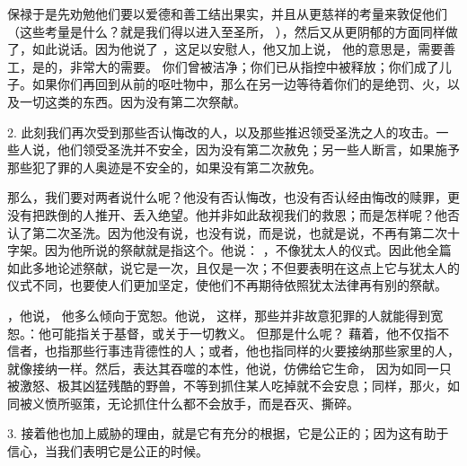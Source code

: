 保禄于是先劝勉他们要以爱德和善工结出果实，并且从更慈祥的考量来敦促他们（这些考量是什么？就是我们得以进入至圣所， ），然后又从更阴郁的方面同样做了，如此说话。因为他说了 ，这足以安慰人，他又加上说， 他的意思是，需要善工，是的，非常大的需要。 你们曾被洁净；你们已从指控中被释放；你们成了儿子。如果你们再回到从前的呕吐物中，那么在另一边等待着你们的是绝罚、火，以及一切这类的东西。因为没有第二次祭献。\par

2. 此刻我们再次受到那些否认悔改的人，以及那些推迟领受圣洗之人的攻击。一些人说，他们领受圣洗并不安全，因为没有第二次赦免；另一些人断言，如果施予那些犯了罪的人奥迹是不安全的，如果没有第二次赦免。\par

那么，我们要对两者说什么呢？他没有否认悔改，也没有否认经由悔改的赎罪，更没有把跌倒的人推开、丢入绝望。他并非如此敌视我们的救恩；而是怎样呢？他否认了第二次圣洗。因为他没有说，也没有说，而是说，也就是说，不再有第二次十字架。因为他所说的祭献就是指这个。他说： ，不像犹太人的仪式。因此他全篇如此多地论述祭献，说它是一次，且仅是一次；不但要表明在这点上它与犹太人的仪式不同，也要使人们更加坚定，使他们不再期待依照犹太法律再有别的祭献。\par

，他说， 他多么倾向于宽恕。他说， 这样，那些并非故意犯罪的人就能得到宽恕。：他可能指关于基督，或关于一切教义。 但那是什么呢？ 藉着，他不仅指不信者，也指那些行事违背德性的人；或者，他也指同样的火要接纳那些家里的人，就像接纳一样。然后，表达其吞噬的本性，他说，仿佛给它生命， 因为如同一只被激怒、极其凶猛残酷的野兽，不等到抓住某人吃掉就不会安息；同样，那火，如同被义愤所驱策，无论抓住什么都不会放手，而是吞灭、撕碎。\par

3. 接着他也加上威胁的理由，就是它有充分的根据，它是公正的；因为这有助于信心，当我们表明它是公正的时候。\par

